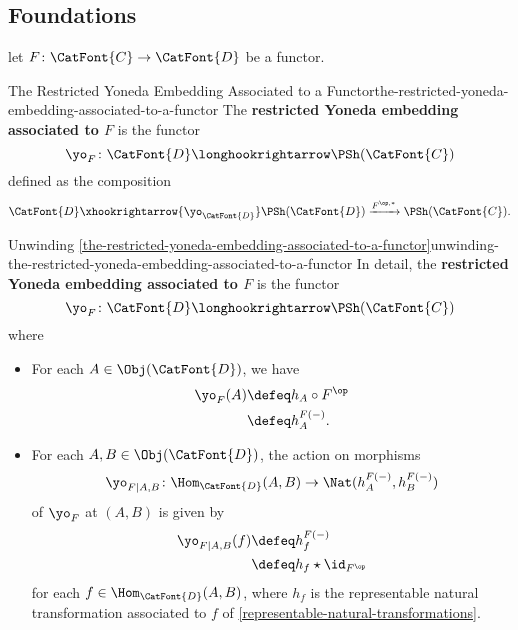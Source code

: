 \subsection{Foundations}\label{subsection-restricted-yoneda-embeddings-foundations}
let $F\colon\CatFont{C}\to\CatFont{D}$ be a functor.
\begin{definition}{The Restricted Yoneda Embedding Associated to a Functor}{the-restricted-yoneda-embedding-associated-to-a-functor}%
    The \textbf{restricted Yoneda embedding associated to $F$} is the functor
    \[
        \yo_{F}%
        \colon%
        \CatFont{D}%
        \longhookrightarrow%
        \PSh(\CatFont{C})%
    \]%
    defined as the composition
    \[
        \CatFont{D}
        \xhookrightarrow{\yo_{\CatFont{D}}}
        \PSh(\CatFont{D})
        \xrightarrow{F^{\op,*}}
        \PSh(\CatFont{C}).
    \]%
\end{definition}
\begin{remark}{Unwinding \cref{the-restricted-yoneda-embedding-associated-to-a-functor}}{unwinding-the-restricted-yoneda-embedding-associated-to-a-functor}%
    In detail, the \textbf{restricted Yoneda embedding associated to $F$} is the functor
    \[
        \yo_{F}%
        \colon%
        \CatFont{D}%
        \longhookrightarrow%
        \PSh(\CatFont{C})%
    \]%
    where
    \begin{itemize}
        \item{}For each $A\in\Obj(\CatFont{D})$, we have
            \begin{align*}
                \yo_{F}(A) &\defeq h_{A}\circ F^{\op}\\
                           &\defeq h^{F(-)}_{A}.
            \end{align*}
        \item{}For each $A,B\in\Obj(\CatFont{D})$, the action on morphisms
            \[
                \yo_{F|A,B}%
                \colon%
                \Hom_{\CatFont{D}}(A,B)%
                \to%
                \Nat(h^{F(-)}_{A},h^{F(-)}_{B})%
            \]%
            of $\yo_{F}$ at $(A,B)$ is given by
            \begin{align*}
                \yo_{F|A,B}(f) &\defeq h^{F(-)}_{f}\\%
                               &\defeq h_{f}\star\id_{F^{\op}}%
            \end{align*}
            for each $f\in\Hom_{\CatFont{D}}(A,B)$, where $h_{f}$ is the representable natural transformation associated to $f$ of \cref{representable-natural-transformations}.
    \end{itemize}
\end{remark}
